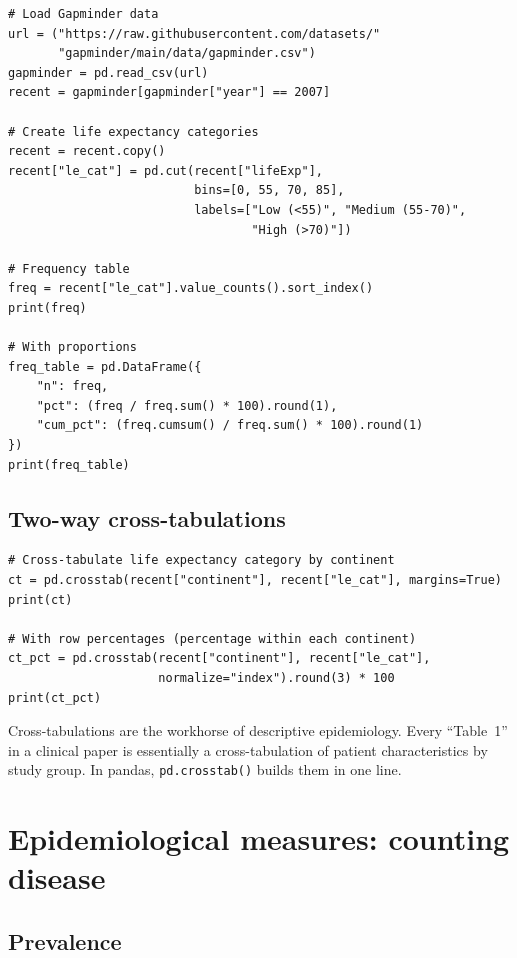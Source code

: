 \begin{verbatim}
# Load Gapminder data
url = ("https://raw.githubusercontent.com/datasets/"
       "gapminder/main/data/gapminder.csv")
gapminder = pd.read_csv(url)
recent = gapminder[gapminder["year"] == 2007]

# Create life expectancy categories
recent = recent.copy()
recent["le_cat"] = pd.cut(recent["lifeExp"],
                          bins=[0, 55, 70, 85],
                          labels=["Low (<55)", "Medium (55-70)",
                                  "High (>70)"])

# Frequency table
freq = recent["le_cat"].value_counts().sort_index()
print(freq)

# With proportions
freq_table = pd.DataFrame({
    "n": freq,
    "pct": (freq / freq.sum() * 100).round(1),
    "cum_pct": (freq.cumsum() / freq.sum() * 100).round(1)
})
print(freq_table)
\end{verbatim}

\subsection{Two-way cross-tabulations}

\begin{verbatim}
# Cross-tabulate life expectancy category by continent
ct = pd.crosstab(recent["continent"], recent["le_cat"], margins=True)
print(ct)

# With row percentages (percentage within each continent)
ct_pct = pd.crosstab(recent["continent"], recent["le_cat"],
                     normalize="index").round(3) * 100
print(ct_pct)
\end{verbatim}

\begin{clinicalnote}
Cross-tabulations are the workhorse of descriptive epidemiology. Every ``Table~1'' in a clinical paper is essentially a cross-tabulation of patient characteristics by study group. In pandas, \texttt{pd.crosstab()} builds them in one line.
\end{clinicalnote}

\section{Epidemiological measures: counting disease}

\subsection{Prevalence}

